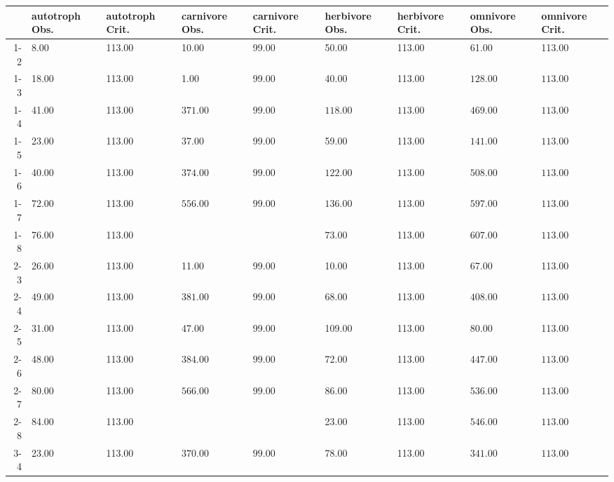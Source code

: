 \begin{table}[ht]
\centering
\begin{tabular}{rllllllll}
  \toprule
 & autotroph Obs. & autotroph Crit. & carnivore Obs. & carnivore Crit. & herbivore Obs. & herbivore Crit. & omnivore Obs. & omnivore Crit. \\ 
  \midrule
1-2 & 8.00 & 113.00 & 10.00 & 99.00 & 50.00 & 113.00 & 61.00 & 113.00 \\ 
  1-3 & 18.00 & 113.00 & 1.00 & 99.00 & 40.00 & 113.00 & \(\mathbf{128.00}\) & \(\mathbf{113.00}\) \\ 
  1-4 & 41.00 & 113.00 & \(\mathbf{371.00}\) & \(\mathbf{99.00}\) & \(\mathbf{118.00}\) & \(\mathbf{113.00}\) & \(\mathbf{469.00}\) & \(\mathbf{113.00}\) \\ 
  1-5 & 23.00 & 113.00 & 37.00 & 99.00 & 59.00 & 113.00 & \(\mathbf{141.00}\) & \(\mathbf{113.00}\) \\ 
  1-6 & 40.00 & 113.00 & \(\mathbf{374.00}\) & \(\mathbf{99.00}\) & \(\mathbf{122.00}\) & \(\mathbf{113.00}\) & \(\mathbf{508.00}\) & \(\mathbf{113.00}\) \\ 
  1-7 & 72.00 & 113.00 & \(\mathbf{556.00}\) & \(\mathbf{99.00}\) & \(\mathbf{136.00}\) & \(\mathbf{113.00}\) & \(\mathbf{597.00}\) & \(\mathbf{113.00}\) \\ 
  1-8 & 76.00 & 113.00 &  &  & 73.00 & 113.00 & \(\mathbf{607.00}\) & \(\mathbf{113.00}\) \\ 
  2-3 & 26.00 & 113.00 & 11.00 & 99.00 & 10.00 & 113.00 & 67.00 & 113.00 \\ 
  2-4 & 49.00 & 113.00 & \(\mathbf{381.00}\) & \(\mathbf{99.00}\) & 68.00 & 113.00 & \(\mathbf{408.00}\) & \(\mathbf{113.00}\) \\ 
  2-5 & 31.00 & 113.00 & 47.00 & 99.00 & 109.00 & 113.00 & 80.00 & 113.00 \\ 
  2-6 & 48.00 & 113.00 & \(\mathbf{384.00}\) & \(\mathbf{99.00}\) & 72.00 & 113.00 & \(\mathbf{447.00}\) & \(\mathbf{113.00}\) \\ 
  2-7 & 80.00 & 113.00 & \(\mathbf{566.00}\) & \(\mathbf{99.00}\) & 86.00 & 113.00 & \(\mathbf{536.00}\) & \(\mathbf{113.00}\) \\ 
  2-8 & 84.00 & 113.00 &  &  & 23.00 & 113.00 & \(\mathbf{546.00}\) & \(\mathbf{113.00}\) \\ 
  3-4 & 23.00 & 113.00 & \(\mathbf{370.00}\) & \(\mathbf{99.00}\) & 78.00 & 113.00 & \(\mathbf{341.00}\) & \(\mathbf{113.00}\) \\ 

\end{tabular}
\end{table}
